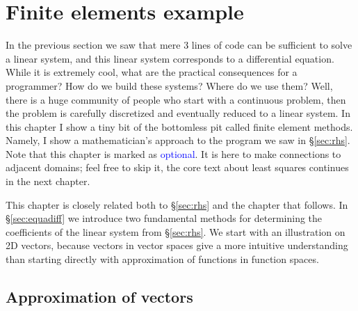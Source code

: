 \documentclass[notitlepage,oneside]{book}
\makeatletter
\newcommand{\authoredby}[1]{\addtocontents{toc}{\protect\@nameuse{authoredby#1}}}%
\makeatother
\begin{document}



\authoredby{A}
\chapter{Finite elements example}
\fancyhead[R]{\textcolor{blue}{optional for reading}}

In the previous section we saw that mere 3 lines of code can be sufficient to solve a linear system, and this linear system corresponds to a differential equation.
While it is extremely cool, what are the practical consequences for a programmer?  How do we build these systems? Where do we use them?
Well, there is a huge community of people who start with a continuous problem, then the problem is carefully discretized and eventually reduced to a linear system.
In this chapter I show a tiny bit of the bottomless pit called finite element methods.
Namely, I show a mathematician's approach to the program we saw in \S\ref{sec:rhs}.
Note that this chapter is marked as \textcolor{blue}{optional}.
It is here to make connections to adjacent domains; feel free to skip it, the core text about least squares continues in the next chapter.

This chapter is closely related both to \S\ref{sec:rhs} and the chapter that follows.
In \S\ref{sec:equadiff} we introduce two fundamental methods for determining the coefficients of the linear system from \S\ref{sec:rhs}.
We start with an illustration on 2D vectors, because vectors in vector spaces give a more intuitive understanding than starting directly with approximation of functions in function spaces.

\section{Approximation of vectors}
\end{document}
